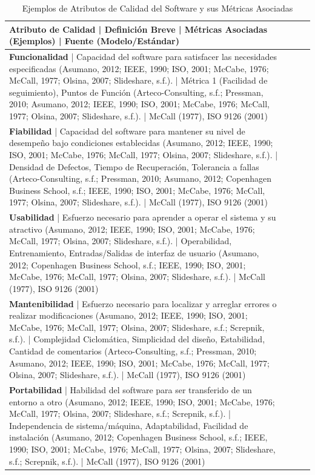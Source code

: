\documentclass[11pt]{article}
\begin{document}
\begin{table}[h!]
\centering
\caption{Ejemplos de Atributos de Calidad del Software y sus Métricas Asociadas}
\begin{tabular}{|l|l|l|l|}
\hline
Atributo de Calidad | Definición Breve | Métricas Asociadas (Ejemplos) | Fuente (Modelo/Estándar) \\
\hline
\textbf{Funcionalidad} | Capacidad del software para satisfacer las necesidades especificadas (Asumano, 2012; IEEE, 1990; ISO, 2001; McCabe, 1976; McCall, 1977; Olsina, 2007; Slideshare, s.f.). | Métrica 1 (Facilidad de seguimiento), Puntos de Función (Arteco-Consulting, s.f.; Pressman, 2010; Asumano, 2012; IEEE, 1990; ISO, 2001; McCabe, 1976; McCall, 1977; Olsina, 2007; Slideshare, s.f.). | McCall (1977), ISO 9126 (2001) \\
\hline
\textbf{Fiabilidad} | Capacidad del software para mantener su nivel de desempeño bajo condiciones establecidas (Asumano, 2012; IEEE, 1990; ISO, 2001; McCabe, 1976; McCall, 1977; Olsina, 2007; Slideshare, s.f.). | Densidad de Defectos, Tiempo de Recuperación, Tolerancia a fallas (Arteco-Consulting, s.f.; Pressman, 2010; Asumano, 2012; Copenhagen Business School, s.f.; IEEE, 1990; ISO, 2001; McCabe, 1976; McCall, 1977; Olsina, 2007; Slideshare, s.f.). | McCall (1977), ISO 9126 (2001) \\
\hline
\textbf{Usabilidad} | Esfuerzo necesario para aprender a operar el sistema y su atractivo (Asumano, 2012; IEEE, 1990; ISO, 2001; McCabe, 1976; McCall, 1977; Olsina, 2007; Slideshare, s.f.). | Operabilidad, Entrenamiento, Entradas/Salidas de interfaz de usuario (Asumano, 2012; Copenhagen Business School, s.f.; IEEE, 1990; ISO, 2001; McCabe, 1976; McCall, 1977; Olsina, 2007; Slideshare, s.f.). | McCall (1977), ISO 9126 (2001) \\
\hline
\textbf{Mantenibilidad} | Esfuerzo necesario para localizar y arreglar errores o realizar modificaciones (Asumano, 2012; IEEE, 1990; ISO, 2001; McCabe, 1976; McCall, 1977; Olsina, 2007; Slideshare, s.f.; Screpnik, s.f.). | Complejidad Ciclomática, Simplicidad del diseño, Estabilidad, Cantidad de comentarios (Arteco-Consulting, s.f.; Pressman, 2010; Asumano, 2012; IEEE, 1990; ISO, 2001; McCabe, 1976; McCall, 1977; Olsina, 2007; Slideshare, s.f.). | McCall (1977), ISO 9126 (2001) \\
\hline
\textbf{Portabilidad} | Habilidad del software para ser transferido de un entorno a otro (Asumano, 2012; IEEE, 1990; ISO, 2001; McCabe, 1976; McCall, 1977; Olsina, 2007; Slideshare, s.f.; Screpnik, s.f.). | Independencia de sistema/máquina, Adaptabilidad, Facilidad de instalación (Asumano, 2012; Copenhagen Business School, s.f.; IEEE, 1990; ISO, 2001; McCabe, 1976; McCall, 1977; Olsina, 2007; Slideshare, s.f.; Screpnik, s.f.). | McCall (1977), ISO 9126 (2001) \\

\end{tabular}
\end{table}
\end{document}
